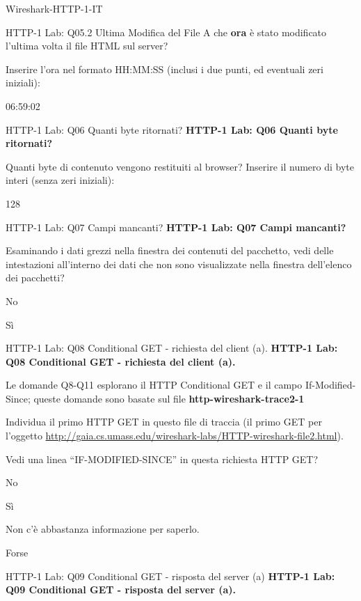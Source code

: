 \documentclass[a4paper]{article}
\begin{document}
\begin{quiz}{Wireshark-HTTP-1-IT}
\begin{shortanswer}[points=1]{HTTP-1 Lab: Q05.2 Ultima Modifica del File}
A che \textbf{ora} è stato modificato l'ultima volta il file HTML sul server? 

Inserire l'ora nel formato HH:MM:SS (inclusi i due punti, ed eventuali zeri iniziali):
\item 06:59:02
\end{shortanswer}

\begin{shortanswer}[points=1]{HTTP-1 Lab: Q06 Quanti byte ritornati?}
\textbf{HTTP-1 Lab: Q06 Quanti byte ritornati?} 

Quanti byte di contenuto vengono restituiti al browser? 
Inserire il numero di byte interi (senza zeri iniziali):
\item 128
\end{shortanswer}

\begin{multi}[points=1,shuffle]{HTTP-1 Lab: Q07 Campi mancanti?}
\textbf{HTTP-1 Lab: Q07 Campi mancanti?} 

Esaminando i dati grezzi nella finestra dei contenuti del pacchetto, vedi delle intestazioni all'interno dei dati che non sono visualizzate nella finestra dell'elenco dei pacchetti?
\item* No
\item Sì
\end{multi}

\begin{multi}[points=1,shuffle]{HTTP-1 Lab: Q08 Conditional GET - richiesta del client (a).}
\textbf{HTTP-1 Lab: Q08 Conditional GET - richiesta del client (a).} 

Le domande Q8-Q11 esplorano il HTTP Conditional GET e il campo If-Modified-Since; queste domande sono basate sul file \textbf{http-wireshark-trace2-1}

Individua il primo HTTP GET in questo file di traccia (il primo GET per l'oggetto \href{http://gaia.cs.umass.edu/wireshark-labs/HTTP-wireshark-file2.html}{http://gaia.cs.umass.edu/wireshark-labs/HTTP-wireshark-file2.html}).

Vedi una linea ``IF-MODIFIED-SINCE'' in questa richiesta HTTP GET?
\item* No
\item Sì
\item Non c'è abbastanza informazione per saperlo.
\item Forse
\end{multi}

\begin{multi}[points=1,shuffle]{HTTP-1 Lab: Q09 Conditional GET - risposta del server (a)}
\textbf{HTTP-1 Lab: Q09 Conditional GET - risposta del server (a).}


\end{multi}
\end{quiz}
\end{document}
